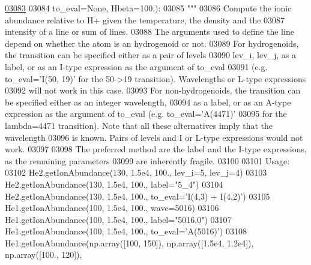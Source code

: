 \begin{DoxyCode}
\hypertarget{classpyneb_1_1core_1_1pynebcore_1_1_rec_atom_l03083}{}\hyperlink{classpyneb_1_1core_1_1pynebcore_1_1_rec_atom_a250ec6b99eedd84bdb8eae97cbd4beef}{03083} 
03084                         to\_eval=\textcolor{keywordtype}{None}, Hbeta=100.):
03085         \textcolor{stringliteral}{"""}
03086 \textcolor{stringliteral}{        Compute the ionic abundance relative to H+ given the temperature, the density and the }
03087 \textcolor{stringliteral}{            intensity of a line or sum of lines.}
03088 \textcolor{stringliteral}{        The arguments used to define the line depend on whether the atom is an hydrogenoid or not. }
03089 \textcolor{stringliteral}{        For hydrogenoids, the transition can be specified either as a pair of levels }
03090 \textcolor{stringliteral}{            lev\_i, lev\_j, as a label, or as an I-type expression as the argument of to\_eval }
03091 \textcolor{stringliteral}{            (e.g. to\_eval='I(50, 19)' for the 50->19 transition). Wavelengths or L-type expressions }
03092 \textcolor{stringliteral}{            will not work in this case. }
03093 \textcolor{stringliteral}{        For non-hydrogenoids, the transition can be specified either as an integer wavelength, }
03094 \textcolor{stringliteral}{            as a label, or as an A-type expression as the argument of to\_eval (e.g. to\_eval='A(4471)' }
03095 \textcolor{stringliteral}{            for the lambda=4471 transition). Note that all these alternatives imply that the wavelength}
03096 \textcolor{stringliteral}{            is known. Pairs of levels and I or L-type expressions would not work.}
03097 \textcolor{stringliteral}{}
03098 \textcolor{stringliteral}{        The preferred method are the label and the I-type expressions, as the remaining parameters }
03099 \textcolor{stringliteral}{            are inherently fragile.}
03100 \textcolor{stringliteral}{}
03101 \textcolor{stringliteral}{        Usage:}
03102 \textcolor{stringliteral}{            He2.getIonAbundance(130, 1.5e4, 100., lev\_i=5, lev\_j=4)}
03103 \textcolor{stringliteral}{            He2.getIonAbundance(130, 1.5e4, 100., label="5\_4")}
03104 \textcolor{stringliteral}{            He2.getIonAbundance(130, 1.5e4, 100., to\_eval='I(4,3) + I(4,2)')}
03105 \textcolor{stringliteral}{            He1.getIonAbundance(100, 1.5e4, 100., wave=5016)}
03106 \textcolor{stringliteral}{            He1.getIonAbundance(100, 1.5e4, 100., label="5016.0")}
03107 \textcolor{stringliteral}{            He1.getIonAbundance(100, 1.5e4, 100., to\_eval='A(5016)')}
03108 \textcolor{stringliteral}{            He1.getIonAbundance(np.array([100, 150]), np.array([1.5e4, 1.2e4]), np.array([100., 120]), }

\end{DoxyCode}
